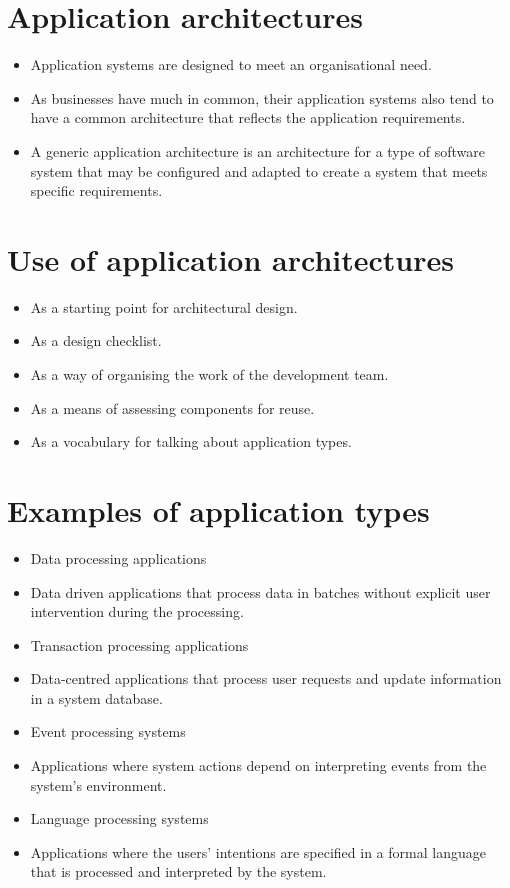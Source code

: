 \section{Application architectures}
\begin{itemize}
\item Application systems are designed to meet an organisational need.

\item As businesses have much in common, their application systems also tend to have a common architecture that reflects the application requirements.

\item A generic application architecture is an architecture for a type of software system that may be configured and adapted to create a system that meets specific requirements.

\end{itemize}
\section{Use of application architectures}
\begin{itemize}
\item As a starting point for architectural design. \item As a design checklist.
\item As a way of organising the work of the development team. \item As a means of assessing components for reuse.
\item As a vocabulary for talking about application types.

\end{itemize}
\section{Examples of application types}
\begin{itemize}
\item Data processing applications

 \item Data driven applications that process data in batches without explicit user intervention during the processing.

\item Transaction processing applications

 \item Data-centred applications that process user requests and update information in a system database.

\item Event processing systems

 \item Applications where system actions depend on interpreting events from the system’s environment.

\item Language processing systems

 \item Applications where the users’ intentions are specified in a formal language that is processed and interpreted by the system.
\end{itemize}
